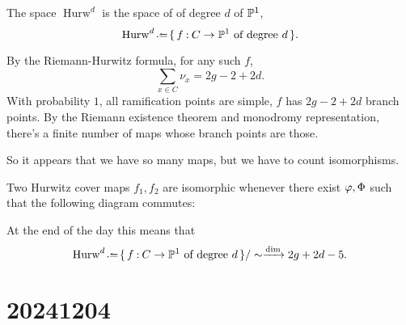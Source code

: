 \documentclass[12pt]{memoir}
\begin{document}
\begin{Def}
    The space $\operatorname{Hurw}^d$ is the space of  of degree $d$ of $\mathbb{P}^1$,
    $$\operatorname{Hurw}^d\defeq\set{f\: C\to\bP^1\text{ of degree }d}.$$
\end{Def}

By the Riemann-Hurwitz formula, for any such $f$,
$$\sum_{x\in C}\nu_x=2g-2+2d.$$
With probability $1$, all ramification points are simple, $f$ has $2g-2+2d$ branch points. By the Riemann existence theorem and monodromy representation, there's a finite number of maps whose branch points are those.\par
So it appears that we have so many maps, but we have to count isomorphisms.

\begin{Def}
    Two Hurwitz cover maps $f_1,f_2$ are isomorphic whenever there exist $\varphi,\Phi$ such that the following diagram commutes:
    \begin{center}
    \end{center}
\end{Def}

At the end of the day this means that 
$$\operatorname{Hurw}^d\defeq\set{f\: C\to\bP^1\text{ of degree }d}/\sim\xrightarrow{\dim}2g+2d-5.$$

\section{20241204}
\end{document}
